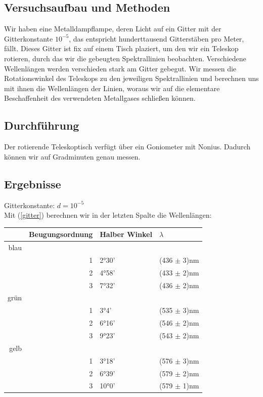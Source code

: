 \documentclass{article}
\begin{document}
\subsection{Versuchsaufbau und Methoden}
Wir haben eine Metalldampflampe, deren Licht auf ein Gitter mit der Gitterkonstante $10^{-5}$, das entspricht hunderttausend Gitterstäben pro Meter, fällt. Dieses Gitter ist fix auf einem Tisch plaziert, um den wir ein Teleskop rotieren, durch das wir die gebeugten Spektrallinien beobachten. Verschiedene Wellenlängen werden verschieden stark am Gitter gebegut. Wir messen die Rotationswinkel des Teleskops zu den jeweiligen Spektrallinien und berechnen uns mit ihnen die Wellenlängen der Linien, woraus wir auf die elementare Beschaffenheit des verwendeten Metallgases schließen können.
\subsection{Durchführung}

Der rotierende Teleskoptisch verfügt über ein Goniometer mit Nonius. Dadurch können wir auf Gradminuten genau messen.

\subsection{Ergebnisse}
Gitterkonstante: $d=10^{-5}$\\
Mit (\ref{gitter}) berechnen wir in der letzten Spalte die Wellenlängen:
\begin{center}
\begin{tabular}{|r|r|l|l|}
\hline
& Beugungsordnung & Halber Winkel & $\lambda$\\
\hline
\hline
blau & & &\\
& 1 & 2°30' & (436 $\pm$ 3)nm\\
& 2 & 4°58' & (433 $\pm$ 2)nm\\
& 3 & 7°32' & (436 $\pm$ 2)nm\\
\hline
grün & & &\\
& 1 & 3°4' & (535 $\pm$ 3)nm\\
& 2 & 6°16' & (546 $\pm$ 2)nm\\
& 3 & 9°23' & (543 $\pm$ 2)nm\\
\hline
gelb & & &\\
& 1 & 3°18' & (576 $\pm$ 3)nm\\
& 2 & 6°39' & (579 $\pm$ 2)nm\\
& 3 & 10°0' & (579 $\pm$ 1)nm\\
\hline
\end{tabular}
\end{center}
\vspace{0.8cm}
\end{document}
